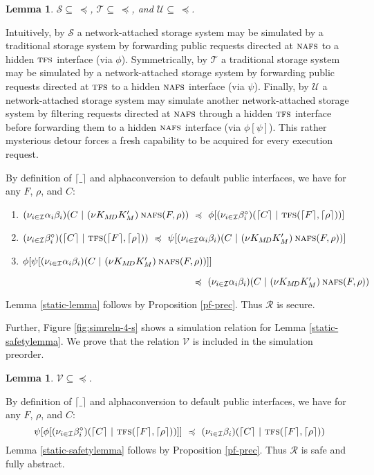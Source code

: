 \documentclass[10pt]{article}
\newtheorem{lemma}[theorem]{Lemma}
\newcommand{\new}[2]{(\nu #1)\:#2}
\newcommand{\betac}{\beta^\circ}
\begin{document}
\begin{lemma} $\mathcal S \subseteq\: \preccurlyeq$, $\mathcal T \subseteq\: \preccurlyeq$, and $\mathcal U \subseteq\: \preccurlyeq$.
\end{lemma}
Intuitively, by $\mathcal S$ a network-attached storage system may be simulated by a traditional storage system by forwarding public requests directed at $\textsc{nafs}$ to a hidden $\textsc{tfs}$ interface (via $\phi$). Symmetrically, by $\mathcal T$ a traditional storage system may be simulated by a network-attached storage system by forwarding public requests directed at $\textsc{tfs}$ to a hidden $\textsc{nafs}$ interface (via $\psi$). 
Finally, by $\mathcal U$ a network-attached storage system may simulate another network-attached storage system by filtering requests directed at $\textsc{nafs}$ through a hidden $\textsc{tfs}$ interface before forwarding them to a hidden $\textsc{nafs}$ interface (via $\phi[\psi]$). This rather mysterious detour forces a fresh capability to be acquired for every execution request.

By definition of $\lceil\_\rceil$ and alphaconversion to default public interfaces, we have for any $F$, $\rho$, and $C$:
\begin{enumerate}
\item $(\nu_{i \in \mathcal I}\alpha_i\beta_i)(C~|~\new{K_{M\!D}K'_M}\textsc{nafs}(F,\rho)) ~\preccurlyeq~ \phi[(\nu_{i \in \mathcal I}\betac_i)(\lceil C\rceil~|~\textsc{tfs}(\lceil F\rceil,\lceil \rho\rceil))] $
\item $(\nu_{i \in \mathcal I}\betac_i)(\lceil C\rceil~|~\textsc{tfs}(\lceil F\rceil,\lceil \rho\rceil)) ~\preccurlyeq ~ \psi[(\nu_{i \in \mathcal I}\alpha_i\beta_i)(C~|~\new{K_{M\!D}K'_M}\textsc{nafs}(F,\rho))] $
\item $\phi[\psi[(\nu_{i \in \mathcal I}\alpha_i\beta_i)(C~|~\new{K_{M\!D}K'_M}\textsc{nafs}(F,\rho))]] $
\par $~~~~~~~~~~~~~~~~~~~~~~~~~~~~~~~~~~~~~~~~~~~~~~~~~~~~~~~\preccurlyeq ~ (\nu_{i \in \mathcal I}\alpha_i\beta_i)(C~|~\new{K_{M\!D}K'_M}\textsc{nafs}(F,\rho))$
\end{enumerate}
Lemma \ref{static-lemma} follows by Proposition \ref{pf-prec}. Thus $\mathcal R$ is secure.

Further, Figure \ref{fig:simreln-4-s} shows a simulation relation for Lemma \ref{static-safetylemma}. We prove that the relation $\mathcal V$ is included in the simulation preorder.
\begin{lemma} $\mathcal V \subseteq \preccurlyeq$.
\end{lemma}
By definition of $\lceil\_\rceil$ and alphaconversion to default public interfaces, we have for any $F$, $\rho$, and $C$:
$$\psi[\phi[(\nu_{i \in \mathcal I}\betac_i)(\lceil C\rceil~|~\textsc{tfs}(\lceil F\rceil ,\lceil \rho\rceil))]]~\preccurlyeq ~ (\nu_{i \in \mathcal I}\beta_i)(\lceil C\rceil~|~\textsc{tfs}(\lceil F\rceil,\lceil \rho\rceil))$$
Lemma \ref{static-safetylemma} follows by Proposition \ref{pf-prec}. Thus $\mathcal R$ is safe and fully abstract.  
\end{document}
